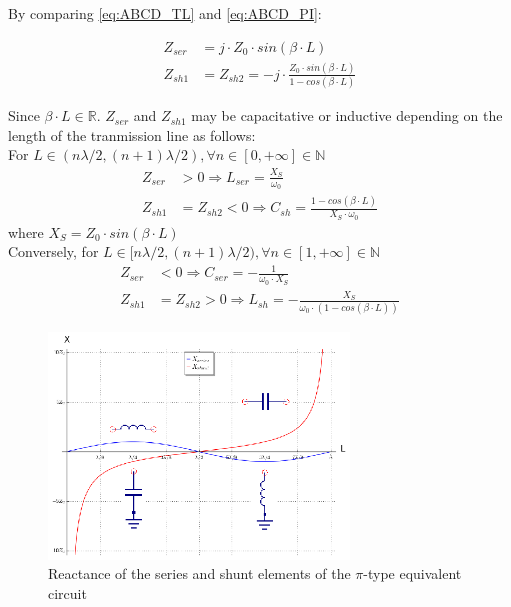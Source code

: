 \noindent By comparing \ref{eq:ABCD_TL} and \ref{eq:ABCD_PI}:

\begin{align}
     Z_{ser} &= j \cdot Z_0 \cdot sin(\beta \cdot L) \\
     Z_{sh1} &= Z_{sh2} = -j \cdot \frac{Z_0 \cdot sin(\beta \cdot L)}{1 - cos(\beta \cdot L)}
\end{align}

\noindent Since $\beta \cdot L \in \mathbb{R}$. $Z_{ser}$ and $Z_{sh1}$ may be capacitative or inductive depending on the length of the tranmission line as follows:\\

\noindent For $L \in (n\lambda/2, (n+1) \lambda/2), \forall n  \in [0, +\infty] \in \mathbb{N}$
\begin{align}
     Z_{ser} &> 0 \Longrightarrow L_{ser} = \frac{X_S}{\omega_0} \\
     Z_{sh1} &= Z_{sh2}  < 0 \Longrightarrow C_{sh} = \frac{1 - cos(\beta \cdot L)}{X_S\cdot \omega_0}
\end{align}
\noindent where $X_S = Z_0 \cdot sin(\beta \cdot L)$\\

\noindent Conversely, for $L \in [n\lambda/2, (n+1) \lambda/2), \forall n  \in [1, +\infty] \in \mathbb{N}$
\begin{align}
     Z_{ser} &< 0 \Longrightarrow C_{ser} = -\frac{1}{\omega_0 \cdot X_S} \\
     Z_{sh1} &= Z_{sh2} > 0  \Longrightarrow L_{sh} = -\frac{X_S}{\omega_0 \cdot (1 - cos(\beta \cdot L))}
\end{align}

\begin{figure}[H]
\centering
\includegraphics[width=80mm]{pi-to-tee-equivalent-implementation}
\caption{Reactance of the series and shunt elements of the $\pi$-type equivalent circuit}
\label{fig:Transmission-Line-Circuit-Equivalent-Values}
\end{figure}

